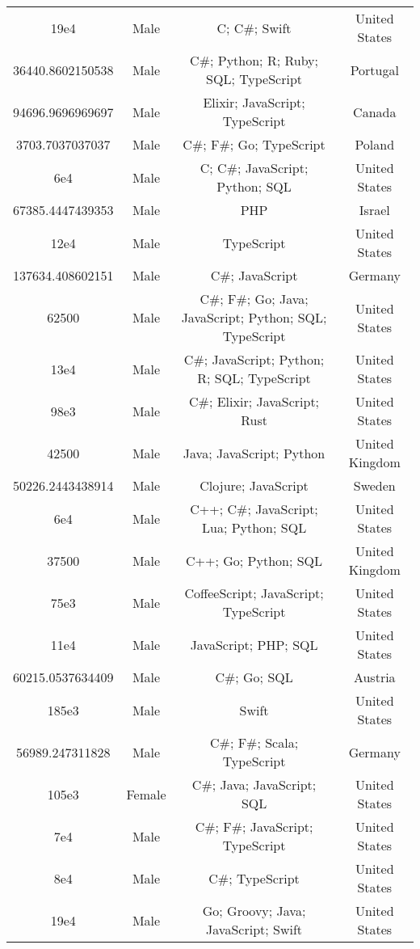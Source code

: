 \begin{center}
\begin{tabular}{ |c|c|c|c| }
19e4  &  Male  &  C; C\#; Swift  &  United States  \\ 
36440.8602150538  &  Male  &  C\#; Python; R; Ruby; SQL; TypeScript  &  Portugal  \\ 
94696.9696969697  &  Male  &  Elixir; JavaScript; TypeScript  &  Canada  \\ 
3703.7037037037  &  Male  &  C\#; F\#; Go; TypeScript  &  Poland  \\ 
6e4  &  Male  &  C; C\#; JavaScript; Python; SQL  &  United States  \\ 
67385.4447439353  &  Male  &  PHP  &  Israel  \\ 
12e4  &  Male  &  TypeScript  &  United States  \\ 
137634.408602151  &  Male  &  C\#; JavaScript  &  Germany  \\ 
62500  &  Male  &  C\#; F\#; Go; Java; JavaScript; Python; SQL; TypeScript  &  United States  \\ 
13e4  &  Male  &  C\#; JavaScript; Python; R; SQL; TypeScript  &  United States  \\ 
98e3  &  Male  &  C\#; Elixir; JavaScript; Rust  &  United States  \\ 
42500  &  Male  &  Java; JavaScript; Python  &  United Kingdom  \\ 
50226.2443438914  &  Male  &  Clojure; JavaScript  &  Sweden  \\ 
6e4  &  Male  &  C++; C\#; JavaScript; Lua; Python; SQL  &  United States  \\ 
37500  &  Male  &  C++; Go; Python; SQL  &  United Kingdom  \\ 
75e3  &  Male  &  CoffeeScript; JavaScript; TypeScript  &  United States  \\ 
11e4  &  Male  &  JavaScript; PHP; SQL  &  United States  \\ 
60215.0537634409  &  Male  &  C\#; Go; SQL  &  Austria  \\ 
185e3  &  Male  &  Swift  &  United States  \\ 
56989.247311828  &  Male  &  C\#; F\#; Scala; TypeScript  &  Germany  \\ 
105e3  &  Female  &  C\#; Java; JavaScript; SQL  &  United States  \\ 
7e4  &  Male  &  C\#; F\#; JavaScript; TypeScript  &  United States  \\ 
8e4  &  Male  &  C\#; TypeScript  &  United States  \\ 
19e4  &  Male  &  Go; Groovy; Java; JavaScript; Swift  &  United States  \\ 

\end{tabular}
\end{center}
